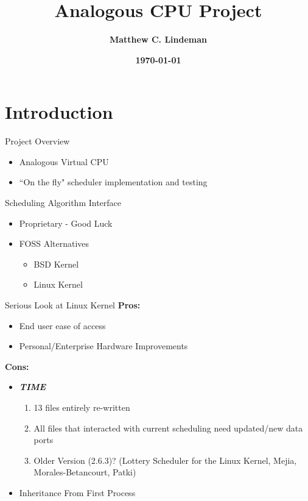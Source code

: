 \documentclass{beamer}
\title{Analogous CPU Project}
\author{\textbf{Matthew C. Lindeman}}
\institute{\textbf{New Mexico Institute of Mining and Technology}}
\date{\textbf{\today}}
\begin{document}
\begin{frame}
    \titlepage
\end{frame}

\section{Introduction}
  \begin{frame}{Project Overview}
    \begin{itemize}
      \item Analogous Virtual CPU
      \item ``On the fly" scheduler implementation and testing
    \end{itemize}
  \end{frame}

  \begin{frame}{Scheduling Algorithm Interface}
    \begin{itemize}
      \item Proprietary - Good Luck
      \item FOSS Alternatives
        \begin{itemize}
          \item BSD Kernel
          \item Linux Kernel
        \end{itemize}
    \end{itemize}
  \end{frame}

  \begin{frame}{Serious Look at Linux Kernel}
    \textbf{Pros:}
    \begin{itemize}
      \item End user ease of access
      \item Personal/Enterprise Hardware Improvements
    \end{itemize}
    \textbf{Cons:}
    \begin{itemize}
      \item \textbf{\textit{TIME}}
        \begin{enumerate}
          \item 13 files entirely re-written
          \item All files that interacted with current scheduling need
            updated/new data ports
          \item Older Version (2.6.3)? (Lottery Scheduler for the Linux Kernel,
            Mejia, Morales-Betancourt, Patki)
        \end{enumerate}
      \item Inheritance From First Process
    \end{itemize}
  \end{frame}
\end{document}
